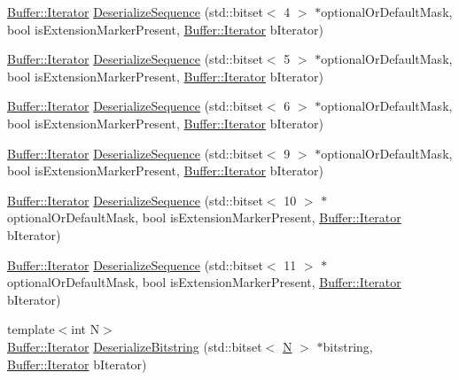 \begin{DoxyCompactItemize}
\item 
\hyperlink{classns3_1_1Buffer_1_1Iterator}{Buffer\+::\+Iterator} \hyperlink{classns3_1_1Asn1Header_aa32b6e9c38193740260d671aed50d53a}{Deserialize\+Sequence} (std\+::bitset$<$ 4 $>$ $\ast$optional\+Or\+Default\+Mask, bool is\+Extension\+Marker\+Present, \hyperlink{classns3_1_1Buffer_1_1Iterator}{Buffer\+::\+Iterator} b\+Iterator)
\item 
\hyperlink{classns3_1_1Buffer_1_1Iterator}{Buffer\+::\+Iterator} \hyperlink{classns3_1_1Asn1Header_a96eb865e1ddfff4857821cfcb3ca139f}{Deserialize\+Sequence} (std\+::bitset$<$ 5 $>$ $\ast$optional\+Or\+Default\+Mask, bool is\+Extension\+Marker\+Present, \hyperlink{classns3_1_1Buffer_1_1Iterator}{Buffer\+::\+Iterator} b\+Iterator)
\item 
\hyperlink{classns3_1_1Buffer_1_1Iterator}{Buffer\+::\+Iterator} \hyperlink{classns3_1_1Asn1Header_ab69ff55a45c4fceeb2c2e5f71374ed28}{Deserialize\+Sequence} (std\+::bitset$<$ 6 $>$ $\ast$optional\+Or\+Default\+Mask, bool is\+Extension\+Marker\+Present, \hyperlink{classns3_1_1Buffer_1_1Iterator}{Buffer\+::\+Iterator} b\+Iterator)
\item 
\hyperlink{classns3_1_1Buffer_1_1Iterator}{Buffer\+::\+Iterator} \hyperlink{classns3_1_1Asn1Header_a53cf1455e27824057c717b268ce1982f}{Deserialize\+Sequence} (std\+::bitset$<$ 9 $>$ $\ast$optional\+Or\+Default\+Mask, bool is\+Extension\+Marker\+Present, \hyperlink{classns3_1_1Buffer_1_1Iterator}{Buffer\+::\+Iterator} b\+Iterator)
\item 
\hyperlink{classns3_1_1Buffer_1_1Iterator}{Buffer\+::\+Iterator} \hyperlink{classns3_1_1Asn1Header_a19b5b00dd6d1c2acd80fc5697d4bc6d4}{Deserialize\+Sequence} (std\+::bitset$<$ 10 $>$ $\ast$optional\+Or\+Default\+Mask, bool is\+Extension\+Marker\+Present, \hyperlink{classns3_1_1Buffer_1_1Iterator}{Buffer\+::\+Iterator} b\+Iterator)
\item 
\hyperlink{classns3_1_1Buffer_1_1Iterator}{Buffer\+::\+Iterator} \hyperlink{classns3_1_1Asn1Header_a1270d40a7e49894265e7c4b47622a380}{Deserialize\+Sequence} (std\+::bitset$<$ 11 $>$ $\ast$optional\+Or\+Default\+Mask, bool is\+Extension\+Marker\+Present, \hyperlink{classns3_1_1Buffer_1_1Iterator}{Buffer\+::\+Iterator} b\+Iterator)
\item 
{\footnotesize template$<$int N$>$ }\\\hyperlink{classns3_1_1Buffer_1_1Iterator}{Buffer\+::\+Iterator} \hyperlink{classns3_1_1Asn1Header_adb34498b05e8562fba5d40f49578968d}{Deserialize\+Bitstring} (std\+::bitset$<$ \hyperlink{loss__ITU1238_8m_aaa6c78b1d659f53598dbe891c1139b3e}{N} $>$ $\ast$bitstring, \hyperlink{classns3_1_1Buffer_1_1Iterator}{Buffer\+::\+Iterator} b\+Iterator)

\end{DoxyCompactItemize}
